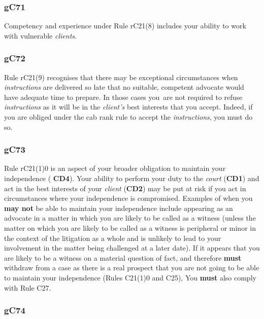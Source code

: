 \subsubsection{\color{darkgrey}gC71}

Competency and experience under Rule rC21(8) includes your ability to
work with vulnerable \emph{clients}.

\subsubsection{\color{darkgrey}gC72}

Rule rC21(9) recognises that there may be exceptional circumstances when
\emph{instructions} are delivered so late that no suitable, competent
advocate would have adequate time to prepare. In those cases you~are not
required to refuse \emph{instructions} as it will be in the
\emph{client's} best interests that you accept. Indeed, if you are
obliged under the cab rank rule to accept the \emph{instructions}, you
must do so.

\subsubsection{\color{darkgrey}gC73}

Rule rC21(1)0 is an aspect of your broader obligation to maintain your
independence ( \textbf{\textcolor{mygold}{CD4}}). Your ability to perform your duty to the
\emph{court} (\textcolor{mygold}{\textbf{CD1}}) and act in the best interests of your \emph{client}
(\textcolor{mygold}{\textbf{CD2}}) may be put at risk if you act in circumstances where your
independence is compromised. Examples of when you \textcolor{myred}{\textbf{may not}} be able to
maintain your independence include appearing as an advocate in a matter
in which you are likely to be called as a witness (unless the matter on
which you are likely to be called as a witness is peripheral or minor in
the context of the litigation as a whole and is unlikely to lead to your
involvement in the matter being challenged at a later date). If it
appears that you are likely to be a witness on a material question of
fact, and therefore \textcolor{myred}{\textbf{must}} withdraw from a case as there is a real
prospect that you are not going to be able to maintain your independence
(Rules C21(1)0 and C25), You \textcolor{myred}{\textbf{must}} also comply with Rule C27.

\subsubsection{\color{darkgrey}gC74}

